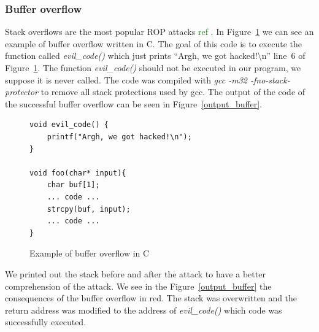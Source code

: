 \documentclass[11pt]{sdm}
\begin{document}
\subsubsection{Buffer overflow}
\label{ssub:Buffer overflow}

Stack overflows are the most popular ROP attacks \textcolor{green}{ref} . In Figure~\ref{buffer_overflow_code} we can see an example of buffer overflow written in C.
The goal of this code is to execute the function called \textit{evil\_code()} which just prints ``Argh, we got hacked!\textbackslash{n}'' line~6 of Figure~\ref{buffer_overflow_code}. The function \textit{evil\_code()} should not be executed in our program, we suppose it is never called.
The code was compiled with \textit{gcc -m32 -fno-stack-protector} to remove all stack protections used by gcc. The output of the code of the successful buffer overflow can be seen in Figure~\ref{output_buffer}.
\begin{figure}[!ht]
\begin{lstlisting}
void evil_code() {
	printf("Argh, we got hacked!\n");
}

void foo(char* input){
	char buf[1];
	... code ...
	strcpy(buf, input);
	... code ...
}
\end{lstlisting}
\centering
\caption{Example of buffer overflow in C}
\label{buffer_overflow_code}
\end{figure}

We printed out the stack before and after the attack to have a better comprehension of the attack.
We see in the Figure~\ref{output_buffer} the consequences of the buffer overflow in red. The stack was overwritten and the return address was modified to the address of \textit{evil\_code()} which code was successfully executed.
\end{document}
